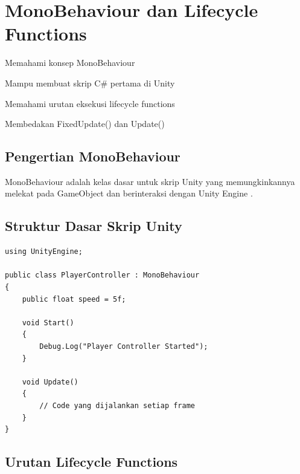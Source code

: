 \section{MonoBehaviour dan Lifecycle Functions}

\begin{learningoutcomes}
\item Memahami konsep MonoBehaviour
\item Mampu membuat skrip C\# pertama di Unity
\item Memahami urutan eksekusi lifecycle functions
\item Membedakan FixedUpdate() dan Update()
\end{learningoutcomes}

\subsection{Pengertian MonoBehaviour}

\begin{definisi}[MonoBehaviour]
MonoBehaviour adalah kelas dasar untuk skrip Unity yang memungkinkannya melekat pada GameObject dan berinteraksi dengan Unity Engine \cite{UnityScriptingAPI2024}.
\end{definisi}

\subsection{Struktur Dasar Skrip Unity}

\begin{lstlisting}[language={[Sharp]C}, caption=Contoh Skrip Unity Dasar]
using UnityEngine;

public class PlayerController : MonoBehaviour
{
    public float speed = 5f;
    
    void Start()
    {
        Debug.Log("Player Controller Started");
    }
    
    void Update()
    {
        // Code yang dijalankan setiap frame
    }
}
\end{lstlisting}

\subsection{Urutan Lifecycle Functions}

